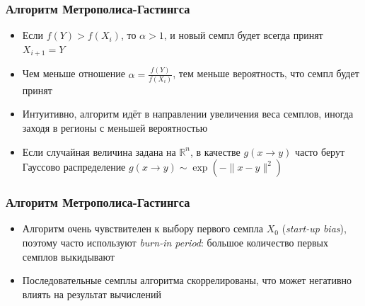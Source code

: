 \documentclass[10pt]{beamer}
\begin{document}
\begin{frame}
\frametitle{Алгоритм Метрополиса-Гастингса}
\begin{itemize}
\item Если \begin{math}f(Y) > f(X_i)\end{math}, то \begin{math}\alpha > 1\end{math}, и новый семпл будет всегда принят \begin{math}X_{i+1} = Y\end{math}
\pause
\item Чем меньше отношение \begin{math}\alpha = \frac{f(Y)}{f(X_i)}\end{math}, тем меньше вероятность, что семпл будет принят
\pause
\item Интуитивно, алгоритм идёт в направлении увеличения веса семплов, иногда заходя в регионы с меньшей вероятностью
\pause
\item Если случайная величина задана на \begin{math}\mathbb R^n\end{math}, в качестве \begin{math}g(x \rightarrow y)\end{math} часто берут Гауссово распределение \begin{math}g(x \rightarrow y) \sim \exp(-\|x-y\|^2)\end{math}
\end{itemize}
\end{frame}

\begin{frame}
\frametitle{Алгоритм Метрополиса-Гастингса}
\begin{itemize}
\item Алгоритм очень чувствителен к выбору первого семпла \begin{math}X_0\end{math} (\textit{start-up bias}), поэтому часто используют \textit{burn-in period}: большое количество первых семплов выкидывают
\pause
\item Последовательные семплы алгоритма скоррелированы, что может негативно влиять на результат вычислений
\end{itemize}
\end{frame}
\end{document}
